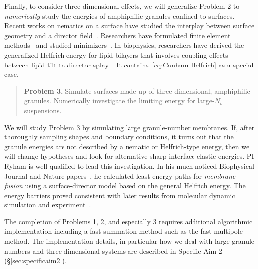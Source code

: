 Finally, to consider three-dimensional effects, we will generalize
Problem 2 to \emph{numerically} study the energies of amphiphilic
granules confined to surfaces. Recent works on nematics on a surface have
studied the interplay between surface geometry and a director
field~\cite{Nestler2020PropertiesOS, Nitschke2018NematicLC,
Nestler2018OrientationalOO, Nitschke2019HydrodynamicII,
Nitschke2020LiquidCO}. Researchers have formulated finite element
methods~\cite{Bartels2012FiniteEM, Nochetto2015NumericsFL,
Nestler2019AFE} and studied minimizers~\cite{Segatti2014EquilibriumCO,
Segatti2014AnalysisOA}. In biophysics, researchers
have derived the generalized Helfrich energy for lipid bilayers that
involves coupling effects between lipid tilt to director
splay~\cite{Hamm2000ElasticEO, Terzi2019CurvatureTiltTO, Terzi2019ACQ,
  Terzi2017NovelTC, Pinigin2020NewCT,Rangamani20140463}. It contains~\eqref{eq:Canham-Helfrich}
as a special case.
\begin{quotation}
  \noindent
  \textbf{Problem 3.} Simulate surfaces made up of three-dimensional,
  amphiphilic granules. Numerically investigate the limiting energy for
  large-$N_b$ suspensions.
\end{quotation}
We will study Problem 3 by simulating large granule-number membranes.
If, after thoroughly sampling shapes and boundary conditions,
it turns out that the granule energies are not described by
a nematic or Helfrich-type energy, then we will change
hypotheses and look for alternative sharp interface elastic energies.
PI Ryham is well-qualified to lead this investigation.
In his much noticed Biophysical Journal and Nature
papers~\cite{RyKlYaCo16, Chetal16}, he calculated least energy
paths for \emph{membrane fusion} using a surface-director model based on
the general Helfrich energy. The energy barriers 
proved consistent with later results from molecular dynamic
simulation and experiment~\cite{SmRiMu19, 2017PNAS..114.1238F}.

The completion of Problems 1, 2, and especially 3 requires additional
algorithmic implementation including a fast summation method such as the
fast multipole method. The implementation details, in particular how we
deal with large granule numbers and three-dimensional systems are
described in Specific Aim 2 (\S\ref{sec:specificaim2}).




